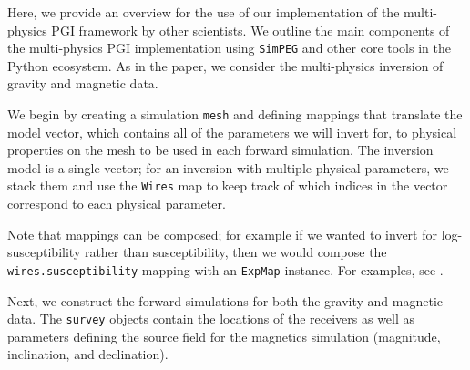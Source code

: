 \documentclass[extra, mreferee]{gji_joint} %
\begin{document}
Here, we provide an overview for the use of our implementation of the multi-physics PGI framework by other scientists. We outline the main components of the multi-physics PGI implementation using \texttt{SimPEG} and other core tools in the Python ecosystem. As in the paper, we consider the multi-physics inversion of gravity and magnetic data.

We begin by creating a simulation \texttt{mesh} and defining mappings that translate the model vector, which contains all of the parameters we will invert for, to physical properties on the mesh to be used in each forward simulation. The inversion model is a single vector; for an inversion with multiple physical parameters, we stack them and use the \texttt{Wires} map to keep track of which indices in the vector correspond to each physical parameter.



Note that mappings can be composed; for example if we wanted to invert for log-susceptibility rather than susceptibility, then we would compose the \texttt{wires.susceptibility} mapping with an \texttt{ExpMap} instance. For examples, see \citet{SeogiMapping}.


Next, we construct the forward simulations for both the gravity and magnetic data. The \texttt{survey} objects contain the locations of the receivers as well as parameters defining the source field for the magnetics simulation (magnitude, inclination, and declination).



\end{document}
